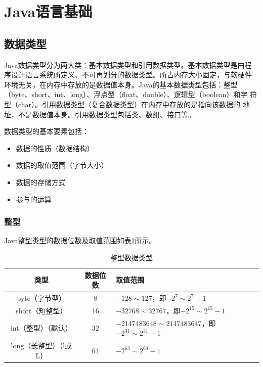 \section{Java语言基础}

\subsection{数据类型}

Java数据类型分为两大类：基本数据类型和引用数据类型。基本数据类型是由程
序设计语言系统所定义、不可再划分的数据类型。所占内存大小固定，与软硬件
环境无关，在内存中存放的是数据值本身。Java的基本数据类型包括：整型
（byte、short、int、long）、浮点型（float、double）、逻辑型（boolean）和字
符型（char）。引用数据类型（复合数据类型）在内存中存放的是指向该数据的
地址，不是数据值本身。引用数据类型包括类、数组、接口等。

数据类型的基本要素包括：

\begin{itemize}
\item 数据的性质（数据结构）
\item 数据的取值范围（字节大小）
\item 数据的存储方式
\item 参与的运算
\end{itemize}



\subsubsection{整型}

Java整型类型的数据位数及取值范围如表\ref{tab:integer-type}所示。

\begin{table}[!htbp]
  \centering
  \caption{整型数据类型}
  \label{tab:integer-type}
  \begin{tabular}{|c|c|l|}
    \hline
    {\bf 类型} & {\bf 数据位数} & {\bf 取值范围}   \\
    \hline
    byte（字节型） & 8 & $-128 \sim 127$，即$-2^{7} \sim 2^{7}-1$\\
    \hline
    short（短整型） & 16 & $-32768 \sim 32767$，即$-2^{15} \sim 2^{15}-1$\\
    \hline
    int（整型）（默认） & 32 & $-2147483648 \sim 2147483647$，即$-2^{31} \sim 2^{31}-1$\\
    \hline
    long（长整型）（l或L） & 64 & $-2^{63} \sim 2^{63}-1$\\
    \hline
  \end{tabular}
\end{table}


